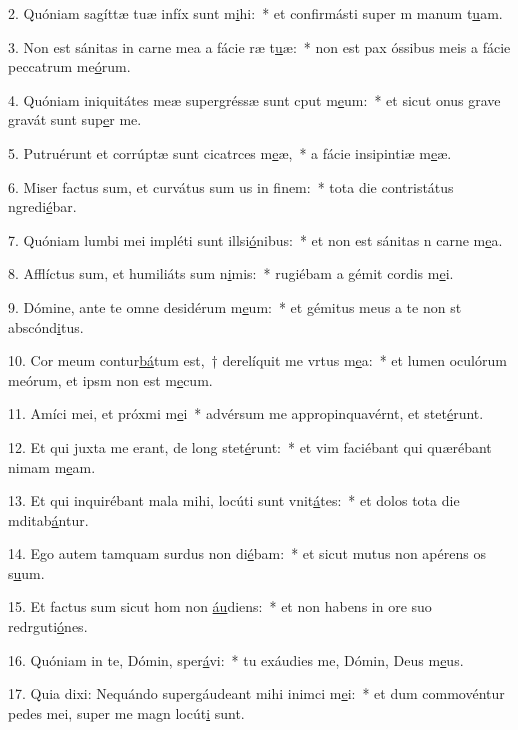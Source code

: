 2. Quóniam sagíttæ tuæ infíx sunt m\uline{i}hi:~* et confirmásti super m manum t\uline{u}am.\par 
3. Non est sánitas in carne mea a fácie ræ t\uline{u}æ:~* non est pax óssibus meis a fácie peccatrum me\uline{ó}rum.\par 
4. Quóniam iniquitátes meæ supergréssæ sunt cput m\uline{e}um:~* et sicut onus grave gravát sunt sup\uline{e}r me.\par 
5. Putruérunt et corrúptæ sunt cicatrces m\uline{e}æ,~* a fácie insipintiæ m\uline{e}æ.\par 
6. Miser factus sum, et curvátus sum us in f\uline{i}nem:~* tota die contristátus ngredi\uline{é}bar.\par 
7. Quóniam lumbi mei impléti sunt illsi\uline{ó}nibus:~* et non est sánitas n carne m\uline{e}a.\par 
8. Afflíctus sum, et humiliáts sum n\uline{i}mis:~* rugiébam a gémit cordis m\uline{e}i.\par 
9. Dómine, ante te omne desidérum m\uline{e}um:~* et gémitus meus a te non st abscónd\uline{i}tus.\par 
10. Cor meum contur\uline{bá}tum est,~† derelíquit me vrtus m\uline{e}a:~* et lumen oculórum meórum, et ipsm non est m\uline{e}cum.\par 
11. Amíci mei, et próxmi m\uline{e}i~* advérsum me appropinquavérnt, et stet\uline{é}runt.\par 
12. Et qui juxta me erant, de long stet\uline{é}runt:~* et vim faciébant qui quærébant nimam m\uline{e}am.\par 
13. Et qui inquirébant mala mihi, locúti sunt vnit\uline{á}tes:~* et dolos tota die mditab\uline{á}ntur.\par 
14. Ego autem tamquam surdus non di\uline{é}bam:~* et sicut mutus non apérens os s\uline{u}um.\par 
15. Et factus sum sicut hom non \uline{áu}diens:~* et non habens in ore suo redrguti\uline{ó}nes.\par 
16. Quóniam in te, Dómin, sper\uline{á}vi:~* tu exáudies me, Dómin, Deus m\uline{e}us.\par 
17. Quia dixi: Nequándo supergáudeant mihi inimci m\uline{e}i:~* et dum commovéntur pedes mei, super me magn locút\uline{i} sunt.\par 
